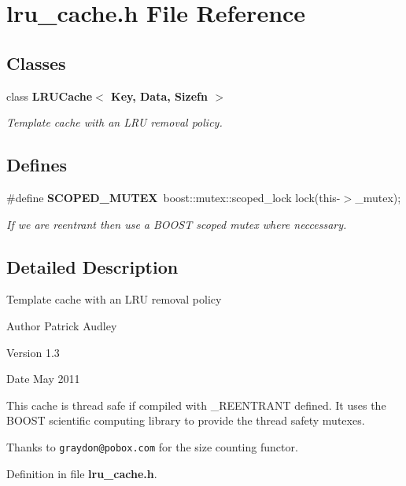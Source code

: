 \section{lru\_\-cache.h File Reference}
\label{lru__cache_8h}
\subsection*{Classes}
\begin{DoxyCompactItemize}
\item 
class {\bf LRUCache$<$ Key, Data, Sizefn $>$}
\begin{DoxyCompactList}\small\item\em Template cache with an LRU removal policy. \item\end{DoxyCompactList}\end{DoxyCompactItemize}
\subsection*{Defines}
\begin{DoxyCompactItemize}
\item 
\#define {\bf SCOPED\_\-MUTEX}~boost::mutex::scoped\_\-lock lock(this-\/$>$\_\-mutex);\label{lru__cache_8h_a7a1d17c8eef1fd310a6522744483ae52}

\begin{DoxyCompactList}\small\item\em If we are reentrant then use a BOOST scoped mutex where neccessary. \item\end{DoxyCompactList}\end{DoxyCompactItemize}


\subsection{Detailed Description}
Template cache with an LRU removal policy \begin{DoxyAuthor}{Author}
Patrick Audley 
\end{DoxyAuthor}
\begin{DoxyVersion}{Version}
1.3 
\end{DoxyVersion}
\begin{DoxyDate}{Date}
May 2011 
\end{DoxyDate}
\begin{DoxyParagraph}{}
This cache is thread safe if compiled with \_\-REENTRANT defined. It uses the BOOST scientific computing library to provide the thread safety mutexes.
\end{DoxyParagraph}
\begin{DoxyParagraph}{}
Thanks to {\tt graydon@pobox.com} for the size counting functor. 
\end{DoxyParagraph}


Definition in file {\bf lru\_\-cache.h}.

